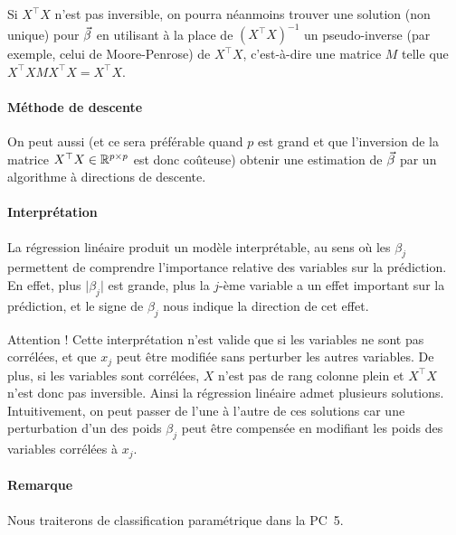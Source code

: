Si $X^\top X$ n'est pas inversible, on pourra néanmoins trouver une solution
(non unique) pour $\bbeta$ en utilisant à la place de
$\left(X^\top X \right)^{-1}$ un pseudo-inverse (par exemple, celui de
Moore-Penrose) de $X^\top X$, c'est-à-dire une matrice $M$ telle que
$X^\top X M X^\top X = X^\top X.$

\paragraph{Méthode de descente}
On peut aussi (et ce sera préférable quand $p$ est grand et que l'inversion de
la matrice $X^\top X \in \mathbb{R}^{p \times p}$ est donc coûteuse) obtenir une
estimation de $\bbeta$ par un algorithme à directions de descente.

\paragraph{Interprétation} La régression linéaire produit un modèle interprétable, au sens où les
$\beta_j$ permettent de comprendre l'importance relative des variables sur la
prédiction. En effet, plus $\lvert \beta_j \rvert$ est grande, plus la $j$-ème
variable a un effet important sur la prédiction, et le signe de $\beta_j$ nous
indique la direction de cet effet.

Attention ! Cette interprétation n'est valide que si les variables ne sont pas
corrélées, et que $x_j$ peut être modifiée sans perturber les autres
variables. De plus, si les variables sont corrélées, $X$ n'est pas de rang
colonne plein et $X^\top X$ n'est donc pas inversible. Ainsi la régression
linéaire admet plusieurs solutions. Intuitivement, on peut passer de l'une à
l'autre de ces solutions car une perturbation d'un des poids $\beta_j$ peut
être compensée en modifiant les poids des variables corrélées à $x_j$.

\paragraph{Remarque} %
Nous traiterons de classification paramétrique dans la PC~5.





